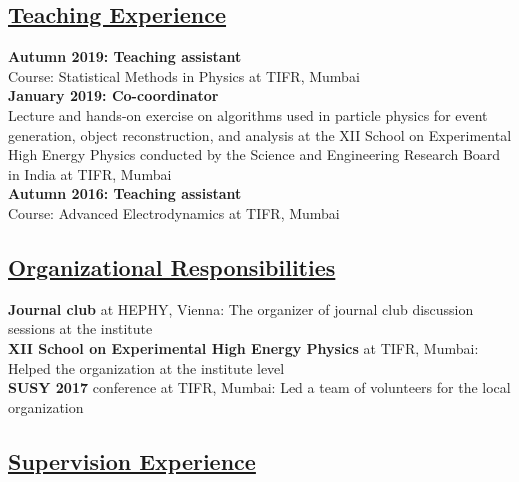 \documentclass[a4paper,11pt]{article}
\begin{document}
{
\subsection*{\underline{Teaching Experience}}

\textbf{Autumn 2019: Teaching assistant}\\
Course: Statistical Methods in Physics at TIFR, Mumbai \\
\textbf{January 2019: Co-coordinator}\\
Lecture and hands-on exercise on algorithms used in particle physics for event generation, object reconstruction, and analysis
at the XII School on Experimental High Energy Physics conducted by the Science and Engineering Research Board in India at TIFR, Mumbai \\
\textbf{Autumn 2016: Teaching assistant}\\
Course: Advanced Electrodynamics at TIFR, Mumbai

\subsection*{\underline{Organizational Responsibilities}}

\textbf{Journal club} at HEPHY, Vienna: 
The organizer of journal club discussion sessions at the institute\\
\textbf{XII School on Experimental High Energy Physics} at TIFR, Mumbai:
Helped the organization at the institute level\\
\textbf{SUSY 2017} conference at TIFR, Mumbai:
Led a team of volunteers for the local organization

\subsection*{\underline{Supervision Experience}}

}
\end{document}
